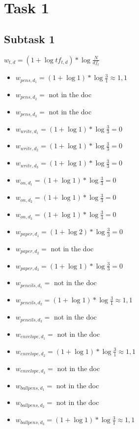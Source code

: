 \documentclass[a4paper]{scrartcl}
\begin{document}
    
\section*{Task 1}
\subsection*{Subtask 1}
\begin{center}
    $w_{t,d}=(1+\log tf_{t,d})*\log \frac{N}{df_t}$
\end{center}
\begin{itemize}
    \item $w_{pens, d_1} = (1+\log 1) * \log \frac{3}{1} \approx  1,1$
    \item $w_{pens, d_2} = $ not in the doc
    \item $w_{pens, d_3} = $ not in the doc
    \item $w_{write, d_1} = (1+\log 1) * \log \frac{3}{3} = 0$
    \item $w_{write, d_2} = (1+\log 1) * \log \frac{3}{3} = 0$
    \item $w_{write, d_3} = (1+\log 1) * \log \frac{3}{3} = 0$
    \item $w_{on, d_1} = (1+\log 1) * \log \frac{3}{3} = 0$
    \item $w_{on, d_2} = (1+\log 1) * \log \frac{3}{3} = 0$
    \item $w_{on, d_3} = (1+\log 1) * \log \frac{3}{3} = 0$
    \item $w_{paper, d_1} = (1+\log 2) * \log \frac{3}{3} = 0$
    \item $w_{paper, d_2} = $ not in the doc
    \item $w_{paper, d_3} = (1+\log 1) * \log \frac{3}{3} = 0$
    \item $w_{pencils, d_1} = $ not in the doc
    \item $w_{pencils, d_2} = (1+\log 1) * \log \frac{3}{1} \approx 1,1$
    \item $w_{pencils, d_3} = $ not in the doc
    \item $w_{envelope, d_1} = $ not in the doc
    \item $w_{envelope, d_2} = (1+\log 1) * \log \frac{3}{1} \approx 1,1$
    \item $w_{envelope, d_3} = $ not in the doc
    \item $w_{ballpens, d_1} = $ not in the doc
    \item $w_{ballpens, d_2} = $ not in the doc
    \item $w_{ballpens, d_3} = (1+\log 1) * \log \frac{3}{1} \approx 1,1$
\end{itemize}
\end{document}
